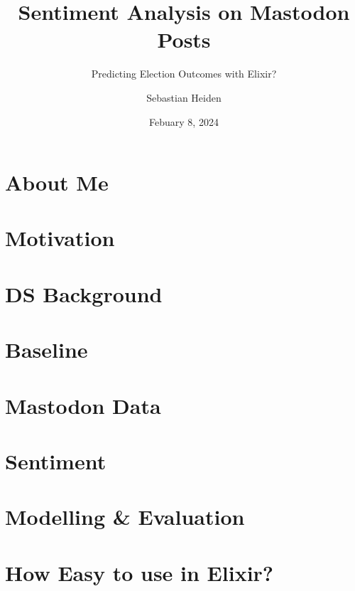\documentclass[usenames,dvipsnames,aspectratio=169]{beamer}
\title{Sentiment Analysis on Mastodon Posts}
\subtitle{Predicting Election Outcomes with Elixir?}
\author{Sebastian Heiden}
\institute{Harz University of Applied Sciences}
\date{Febuary 8, 2024}
\begin{document}
	
	{
		\begin{frame}
			\titlepage
		\end{frame}
	}
	
	
	\section{About Me}
	
	
	\section{Motivation}
	
	
	\section{DS Background}
	
	
	\section{Baseline}
	

	\section{Mastodon Data}
	
	
	\section{Sentiment}
	
	
	\section{Modelling \& Evaluation}
	
	
	\section{How Easy to use in Elixir?}
	
	
\end{document}
